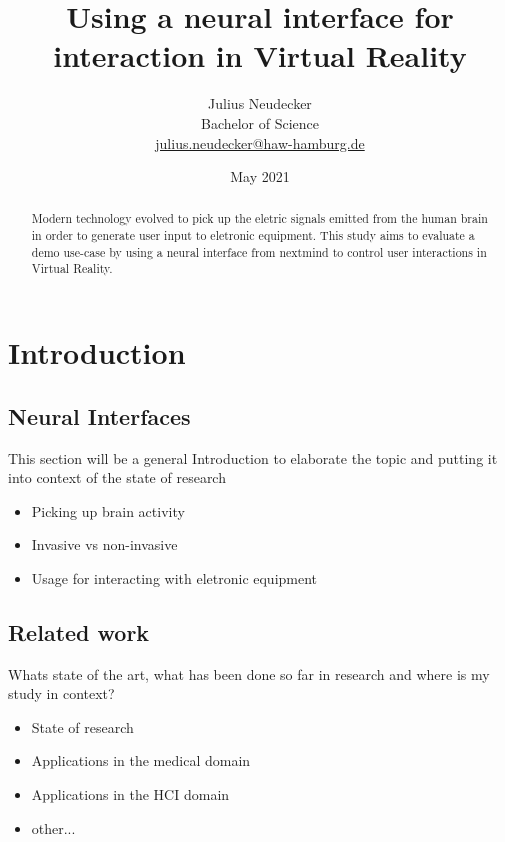 \documentclass[titlepage, a4paper, 11pt]{scrartcl}
\begin{document}
    \title{Using a neural interface for interaction in Virtual Reality}
    \author{Julius Neudecker \\ Bachelor of Science \\ \href{mailto:julius.neudecker@haw-hamburg.de}{julius.neudecker@haw-hamburg.de} }
    \date{May 2021}

    \maketitle

    \tableofcontents

    \begin{abstract}
        Modern technology evolved to pick up the eletric signals emitted from the human brain in order to generate user input to eletronic equipment. This study aims to evaluate a demo use-case by using a neural interface from nextmind to control user interactions in Virtual Reality.
    \end{abstract}

    \section{Introduction}

        \subsection{Neural Interfaces}

            This section will be a general Introduction to elaborate the topic and putting it into context of the state of research

            \begin{itemize}
                \item Picking up brain activity
                \item Invasive vs non-invasive
                \item Usage for interacting with eletronic equipment
            \end{itemize}

        \subsection{Related work}

            Whats state of the art, what has been done so far in research and where is my study in context?

            \begin{itemize}
                \item State of research
                \item Applications in the medical domain
                \item Applications in the HCI domain
                \item other...
            \end{itemize}
\end{document}
